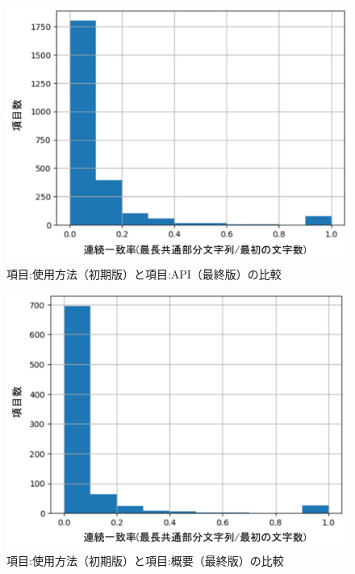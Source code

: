 \documentclass[submit]{ipsj}
\begin{document}
\begin{figure}[t]
 	\centering
		\includegraphics[width=1.0\linewidth]{./IPSJ202303_Ishioka/head_usag_API.pdf}
	\caption{項目:使用方法（初期版）と項目:API（最終版）の比較}
	\label{fig:oss_developments}
\end{figure}
\begin{figure}[t]
 	\centering
		\includegraphics[width=1.0\linewidth]{./IPSJ202303_Ishioka/head_usag_abst.pdf}
	\caption{項目:使用方法（初期版）と項目:概要（最終版）の比較}
	\label{fig:oss_developments}
\end{figure}
\end{document}
